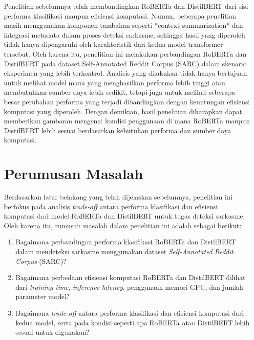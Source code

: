Penelitian sebelumnya telah membandingkan RoBERTa dan DistilBERT dari sisi performa klasifikasi maupun efisiensi komputasi. Namun, beberapa penelitian masih menggunakan komponen tambahan seperti *context summarization* dan integrasi metadata dalam proses deteksi sarkasme, sehingga hasil yang diperoleh tidak hanya dipengaruhi oleh karakteristik dari kedua model transformer tersebut. Oleh karena itu, penelitian ini melakukan perbandingan RoBERTa dan DistilBERT pada dataset Self-Annotated Reddit Corpus (SARC) dalam skenario eksperimen yang lebih terkontrol. Analisis yang dilakukan tidak hanya bertujuan untuk melihat model mana yang menghasilkan performa lebih tinggi atau membutuhkan sumber daya lebih sedikit, tetapi juga untuk melihat seberapa besar perubahan performa yang terjadi dibandingkan dengan keuntungan efisiensi komputasi yang diperoleh. Dengan demikian, hasil penelitian diharapkan dapat memberikan gambaran mengenai kondisi penggunaan di mana RoBERTa maupun DistilBERT lebih sesuai berdasarkan kebutuhan performa dan sumber daya komputasi.


\section{Perumusan Masalah}

Berdasarkan latar belakang yang telah dijelaskan sebelumnya, penelitian ini berfokus pada analisis \textit{trade-off} antara performa klasifikasi dan efisiensi komputasi dari model RoBERTa dan DistilBERT untuk tugas deteksi sarkasme. Oleh karena itu, rumusan masalah dalam penelitian ini adalah sebagai berikut:

\begin{enumerate}
    \item Bagaimana perbandingan performa klasifikasi RoBERTa dan DistilBERT dalam mendeteksi sarkasme menggunakan dataset \textit{Self-Annotated Reddit Corpus} (SARC)?
    
    \item Bagaimana perbedaan efisiensi komputasi RoBERTa dan DistilBERT dilihat dari \textit{training time}, \textit{inference latency}, penggunaan memori GPU, dan jumlah parameter model?
    
    \item Bagaimana \textit{trade-off} antara performa klasifikasi dan efisiensi komputasi dari kedua model, serta pada kondisi seperti apa RoBERTa atau DistilBERT lebih sesuai untuk digunakan?
\end{enumerate}

